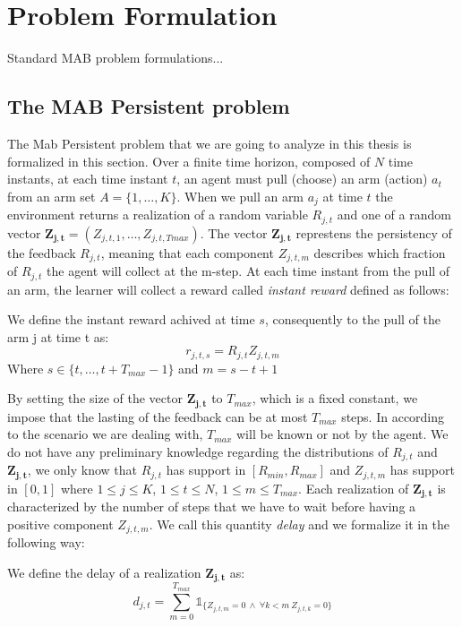 \chapter{Problem Formulation}\label{C10}



Standard MAB problem formulations...

\section{The MAB Persistent problem}

The Mab Persistent problem that we are going to analyze in this thesis is formalized in this section. Over a finite time horizon, composed of $N$ time instants, at each time instant $t$, an agent must pull (choose) an arm (action) $a_t$ from an arm set $A =\{1, \dots, K\} $. When we pull an arm $a_j$ at time $t$ the environment returns a realization of a random variable $R_{j,t}$ and one of a random vector $\boldsymbol{Z_{j,t}}= (Z_{j,t,1},\dots, Z_{j,t,Tmax})$. The vector $\boldsymbol{Z_{j,t}}$ represtens the persistency of the feedback $R_{j,t}$, meaning that each component $Z_{j,t,m}$ describes which fraction of $R_{j,t}$ the agent will collect at the m-step. At each time instant from the pull of an arm, the learner will collect a reward called \emph{instant reward} defined as follows:
\begin{definition}
	We define the instant reward achived at time $s$, consequently to the pull of the arm j at time t as:	
		$$r_{j,t,s} = R_{j,t} Z_{j,t,m}$$
Where $s \in \{t,\dots,t+T_{max}-1\}$ and $m = s-t+1$
\end{definition}
By setting the size of the vector $\boldsymbol{Z_{j,t}}$ to $T_{max}$, which is a fixed constant, we impose that the lasting of the feedback can be at most $T_{max}$ steps. In according to the scenario we are dealing with, $T_{max}$ will be known or not by the agent. We do not have any preliminary knowledge regarding the distributions of $R_{j,t}$ and $\boldsymbol{Z_{j,t}}$, we only know that $R_{j,t}$ has support in $[R_{min},R_{max}]$ and $Z_{j,t,m}$ has support in $[0,1]$ where $1\leq j \leq K$, $1\leq t \leq N$, $1\leq m \leq T_{max}$. Each realization of $\boldsymbol{Z_{j,t}}$ is characterized by the number of steps that we have to wait before having a positive component $Z_{j,t,m}$. We call this quantity \emph{delay} and we formalize it in the following way:
\begin{definition}[Delay]
	We define the delay of a realization $\boldsymbol{Z_{j,t}}$ as:$$d_{j,t} = \sum_{m=0}^{T_{max}}\mathds{1}_{\{Z_{j,t,m}=0\ \wedge\ \forall k<m\ Z_{j,t,k} = 0\}}$$

\end{definition}
